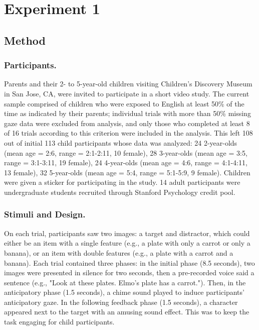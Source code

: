 \documentclass[10pt,letterpaper]{article}
\begin{document}
\section{Experiment 1}

\subsection{Method}

\subsubsection{Participants.}

Parents and their 2- to 5-year-old children visiting Children's Discovery Museum in San Jose, CA, were invited to participate in a short video study. The current sample comprised of children who were exposed to English at least 50\% of the time as indicated by their parents; individual trials with more than 50\% missing gaze data were excluded from analysis, and only those who completed at least 8 of 16 trials according to this criterion were included in the analysis. This left 108 out of initial 113 child participants whose data was analyzed: 24 2-year-olds (mean age = 2:6, range = 2:1-2:11, 10 female), 28 3-year-olds (mean age = 3:5, range = 3:1-3:11, 19 female), 24 4-year-olds (mean age = 4:6, range = 4:1-4:11, 13 female), 32 5-year-olds (mean age = 5:4, range = 5:1-5:9, 9 female). Children were given a sticker for participating in the study. 14 adult participants were undergraduate students recruited through Stanford Psychology credit pool.

\vspace{12pt}

\subsubsection{Stimuli and Design.}

On each trial, participants saw two images: a target and distractor, which could either be an item with a single feature (e.g., a plate with only a carrot or only a banana), or an item with double features (e.g., a plate with a carrot and a banana). Each trial contained three phases: in the initial phase (8.5 seconds), two images were presented in silence for two seconds, then a pre-recorded voice said a sentence (e.g., "Look at these plates. Elmo's plate has a carrot."). Then, in the anticipatory phase (1.5 seconds), a chime sound played to induce participants' anticipatory gaze. In the following feedback phase (1.5 seconds), a character appeared next to the target with an amusing sound effect. This was to keep the task engaging for child participants.
\end{document}
